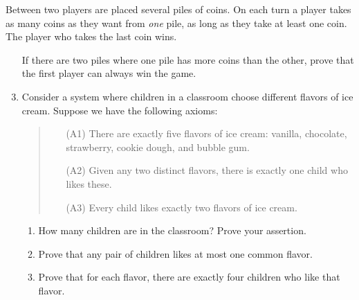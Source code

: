 \begin{exercises}{}{}
\exstart Between two players are placed several piles of coins. On each turn a player takes as many coins as they want from \emph{one} pile, as long as they take at least one coin. The player who takes the last coin wins.

\begin{enumerate}\setcounter{enumi}{1}
  \item[]If there are two piles where one pile has more coins than the other, prove that the first player can always win the game.
  \item Consider a system where children in a classroom choose different flavors of ice cream. Suppose we have the following axioms:
  \begin{quote}
  \begin{itemize}%
  	\item[(A1)] There are exactly five flavors of ice cream: vanilla, chocolate, strawberry, cookie dough, and bubble gum.
  	\item[(A2)] Given any two distinct flavors, there is exactly one child who likes these.
  	\item[(A3)] Every child likes exactly two flavors of ice cream.
  \end{itemize}
  \end{quote}
  \begin{enumerate}%
    \item How many children are in the classroom? Prove your assertion.
    \item Prove that any pair of children likes at most one common flavor.
    \item Prove that for each flavor, there are exactly four children who like that flavor.
	\end{enumerate}
	
% 	


\end{enumerate}
\end{exercises}
